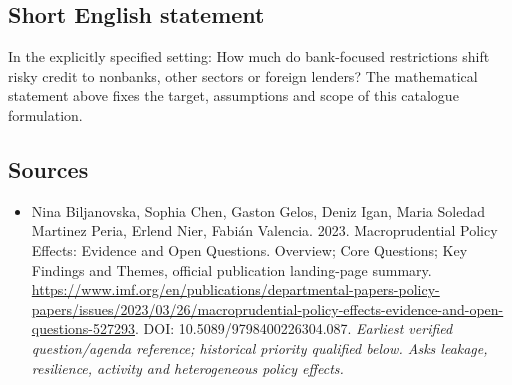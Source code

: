 \documentclass[11pt]{article}
\begin{document}
\subsection{Short English statement}
In the explicitly specified setting: How much do bank-focused restrictions shift risky credit to nonbanks, other sectors or foreign lenders? The mathematical statement above fixes the target, assumptions and scope of this catalogue formulation.

\subsection{Sources}
\begin{itemize}\raggedright
\item[\textnormal{[S1]}]\hypertarget{source:30007605:1}{} Nina Biljanovska, Sophia Chen, Gaston Gelos, Deniz Igan, Maria Soledad Martinez Peria, Erlend Nier, Fabián Valencia. 2023. Macroprudential Policy Effects: Evidence and Open Questions. Overview; Core Questions; Key Findings and Themes, official publication landing-page summary.
\url{https://www.imf.org/en/publications/departmental-papers-policy-papers/issues/2023/03/26/macroprudential-policy-effects-evidence-and-open-questions-527293}.
DOI: 10.5089/9798400226304.087.
{\small\textit{Earliest verified question/agenda reference; historical priority qualified below. Asks leakage, resilience, activity and heterogeneous policy effects.}}
\end{itemize}
\end{document}
